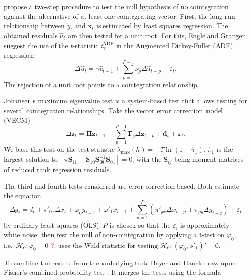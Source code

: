 \documentclass[12pt,a4paper]{article}
\begin{document}
\textcite{Englegranger_1987} propose a two-step procedure to test the
null hypothesis of no cointegration against the alternative of at least
one cointegrating vector. First, the long-run relationship between
\(y_t\) and \(\mathbf{x}_t\) is estimated by least squares regression.
The obtained residuals \(\hat{u}_t\) are then tested for a unit root.
For this, Engle and Granger suggest the use of the \(t\)-statistic
\(t^{\text{ADF}}_\gamma\) in the Augmented Dickey-Fuller (ADF)
regression: \begin{equation}
\Delta \hat{u}_t = \gamma \hat{u}_{t-1} + \sum^{P-1}_{p=1} \nu_p \Delta \hat{u}_{t-p} + \varepsilon_t.
\label{eq:2}
\end{equation} The rejection of a unit root points to a cointegration
relationship.

Johansen's \autocite*{Johansen_1988} maximum eigenvalue test is a
system-based test that allows testing for several cointegration
relationships. Take the vector error correction model (VECM)
\begin{equation}
\Delta \mathbf{z}_t = \mathbf{\Pi z}_{t-1} + \sum^{P-1}_{p = 1} \mathbf{\Gamma}_p \Delta \mathbf{z}_{t-p} + \mathbf{d}_t + \mathbf{\varepsilon}_t.
\label{eq:3}
\end{equation} We base this test on the test statistic
\(\lambda_{\text{max}}(h) = -T \ln(1 - \hat{\pi}_1)\). \(\hat{\pi}_1\)
is the largest solution to
\([\pi \mathbf{S}_{11} - \mathbf{S}_{10} \mathbf{S}_{00}^{-1}\mathbf{S}_{01}] = 0\),
with the \(\mathbf{S}_{ij}\) being moment matrices of reduced rank
regression residuals.

The third and fourth tests considered are error correction-based. Both
estimate the equation \begin{equation}
\Delta y_t = d_t + \pi'_{0x} \Delta x_t + \varphi_0 y_{t-1} + \varphi'_1 x_{t-1} + \sum^P_{p=1} (\pi'_{px} \Delta x_{t-p} + \pi_{py} \Delta y_{t-p}) + \varepsilon_t
\label{eq:4}
\end{equation} by ordinary least squares (OLS). \(P\) is chosen so that
the \(\varepsilon_t\) is approximately white noise.
\textcite{Banerjee_1998} then test the null of non-cointegration by
applying a t-test on \(\varphi_0\),
i.e.~\(\mathcal{H}_0 : \varphi_0 = 0\) \textcolor{red}{?}.
\textcite{Boswijk_1994} uses the Wald statistic for testing
\(\mathcal{H}_0 : (\varphi_0, \phi'_1)' = 0\).

To combine the results from the underlying tests Bayer and Hanck draw
upon Fisher's combined probability test \autocite{Fisher_1932}. It
merges the tests using the formula
\end{document}
